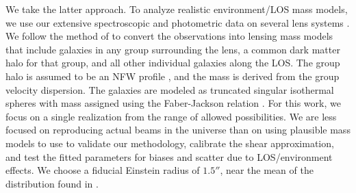 We take the latter approach. To analyze realistic environment/LOS mass models, we use our extensive spectroscopic and photometric data on several lens systems \citep{Wong11}. We follow the method of \citet{Wong11} to convert the observations into lensing mass models that include galaxies in any group surrounding the lens, a common dark matter halo for that group, and all other individual galaxies along the LOS. The group halo is assumed to be an NFW profile \citep{Navarro96}, and the mass is derived from the group velocity dispersion. The galaxies are modeled as truncated singular isothermal spheres with mass assigned using the Faber-Jackson relation \citep{Faber76}. For this work, we focus on a single realization from the range of allowed possibilities.  We are less focused on reproducing actual beams in the universe than on using plausible mass models to use to validate our methodology, calibrate the shear approximation, and test the fitted parameters for biases and scatter due to LOS/environment effects. We choose a fiducial Einstein radius of $1.5''$, near the mean of the distribution found in \citet{Sonnenfeld13}. 
  
  